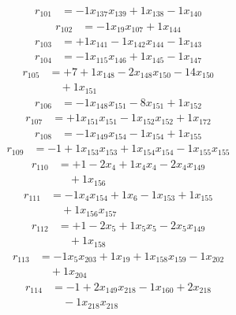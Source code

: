 \[\begin{aligned}
r_{101} &= - 1 x_{137} x_{139} + 1 x_{138} - 1 x_{140}
\end{aligned}\]
\[\begin{aligned}
r_{102} &= - 1 x_{19} x_{107} + 1 x_{144}
\end{aligned}\]
\[\begin{aligned}
r_{103} &= + 1 x_{141} - 1 x_{142} x_{144} - 1 x_{143}
\end{aligned}\]
\[\begin{aligned}
r_{104} &= - 1 x_{115} x_{146} + 1 x_{145} - 1 x_{147}
\end{aligned}\]
\[\begin{aligned}
r_{105} &= + 7 + 1 x_{148} - 2 x_{148} x_{150} - 14 x_{150} \\
 &\quad + 1 x_{151}
\end{aligned}\]
\[\begin{aligned}
r_{106} &= - 1 x_{148} x_{151} - 8 x_{151} + 1 x_{152}
\end{aligned}\]
\[\begin{aligned}
r_{107} &= + 1 x_{151} x_{151} - 1 x_{152} x_{152} + 1 x_{172}
\end{aligned}\]
\[\begin{aligned}
r_{108} &= - 1 x_{149} x_{154} - 1 x_{154} + 1 x_{155}
\end{aligned}\]
\[\begin{aligned}
r_{109} &= - 1 + 1 x_{153} x_{153} + 1 x_{154} x_{154} - 1 x_{155} x_{155}
\end{aligned}\]
\[\begin{aligned}
r_{110} &= + 1 - 2 x_{4} + 1 x_{4} x_{4} - 2 x_{4} x_{149} \\
 &\quad + 1 x_{156}
\end{aligned}\]
\[\begin{aligned}
r_{111} &= - 1 x_{4} x_{154} + 1 x_{6} - 1 x_{153} + 1 x_{155} \\
 &\quad + 1 x_{156} x_{157}
\end{aligned}\]
\[\begin{aligned}
r_{112} &= + 1 - 2 x_{5} + 1 x_{5} x_{5} - 2 x_{5} x_{149} \\
 &\quad + 1 x_{158}
\end{aligned}\]
\[\begin{aligned}
r_{113} &= - 1 x_{5} x_{203} + 1 x_{19} + 1 x_{158} x_{159} - 1 x_{202} \\
 &\quad + 1 x_{204}
\end{aligned}\]
\[\begin{aligned}
r_{114} &= - 1 + 2 x_{149} x_{218} - 1 x_{160} + 2 x_{218} \\
 &\quad - 1 x_{218} x_{218}
\end{aligned}\]
